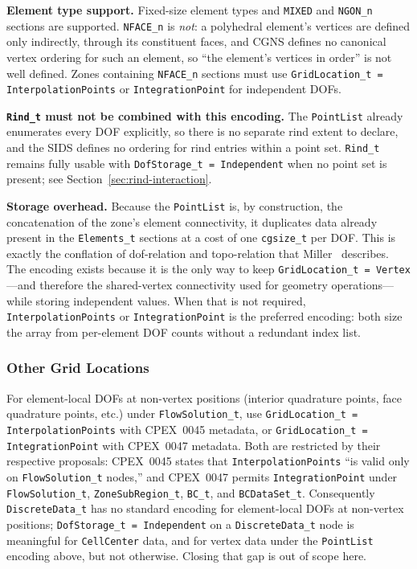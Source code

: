 \documentclass[11pt,letterpaper]{article}
\begin{document}
\textbf{Element type support.}  Fixed-size element types and
\texttt{MIXED} and \texttt{NGON\_n} sections are supported.
\texttt{NFACE\_n} is \emph{not}: a polyhedral element's vertices are
defined only indirectly, through its constituent faces, and CGNS
defines no canonical vertex ordering for such an element, so ``the
element's vertices in order'' is not well defined.  Zones containing
\texttt{NFACE\_n} sections must use
\texttt{GridLocation\_t = InterpolationPoints} or
\texttt{IntegrationPoint} for independent DOFs.

\textbf{\texttt{Rind\_t} must not be combined with this encoding.}
The \texttt{PointList} already enumerates every DOF explicitly, so
there is no separate rind extent to declare, and the SIDS defines no
ordering for rind entries within a point set.  \texttt{Rind\_t}
remains fully usable with \texttt{DofStorage\_t = Independent} when no
point set is present; see Section~\ref{sec:rind-interaction}.

\textbf{Storage overhead.}  Because the \texttt{PointList} is, by
construction, the concatenation of the zone's element connectivity, it
duplicates data already present in the \texttt{Elements\_t} sections at
a cost of one \texttt{cgsize\_t} per DOF.  This is exactly the
conflation of dof-relation and topo-relation that
Miller~\cite{miller2003} describes.  The encoding exists because it is
the only way to keep \texttt{GridLocation\_t = Vertex}---and therefore
the shared-vertex connectivity used for geometry operations---while
storing independent values.  When that is not required,
\texttt{InterpolationPoints} or \texttt{IntegrationPoint} is the
preferred encoding: both size the array from per-element DOF counts
without a redundant index list.

\subsubsection{Other Grid Locations}

For element-local DOFs at non-vertex positions (interior quadrature
points, face quadrature points, etc.) under \texttt{FlowSolution\_t},
use \texttt{GridLocation\_t = InterpolationPoints} with CPEX~0045
metadata, or \texttt{GridLocation\_t = IntegrationPoint} with CPEX~0047
metadata.  Both are restricted by their respective proposals:
CPEX~0045 states that \texttt{InterpolationPoints} ``is valid only on
\texttt{FlowSolution\_t} nodes,'' and CPEX~0047 permits
\texttt{IntegrationPoint} under \texttt{FlowSolution\_t},
\texttt{ZoneSubRegion\_t}, \texttt{BC\_t}, and
\texttt{BCDataSet\_t}.  Consequently \texttt{DiscreteData\_t} has no
standard encoding for element-local DOFs at non-vertex positions;
\texttt{DofStorage\_t = Independent} on a \texttt{DiscreteData\_t} node
is meaningful for \texttt{CellCenter} data, and for vertex data under
the \texttt{PointList} encoding above, but not otherwise.  Closing
that gap is out of scope here.
\end{document}
